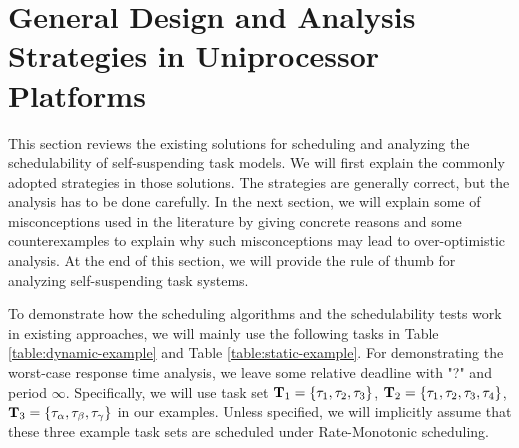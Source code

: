 \section{General Design and Analysis Strategies in Uniprocessor Platforms}
\label{sec:review}

This section reviews the existing solutions for scheduling and analyzing the schedulability of self-suspending task models. We will first explain the commonly adopted strategies in those solutions. The  strategies are generally correct, but the analysis has to be done carefully.  In the next section, we will explain some of misconceptions used in the literature by giving concrete reasons and some counterexamples to explain why such misconceptions may lead to over-optimistic analysis. At the end of this section, we will provide the rule of thumb for analyzing self-suspending task systems. 

To demonstrate how the scheduling algorithms and the schedulability tests work in existing approaches, we will mainly use the following tasks in Table \ref{table:dynamic-example} and Table \ref{table:static-example}. For demonstrating the worst-case response time analysis, we leave some relative deadline with "?" and period $\infty$. Specifically, we will use task set ${\bf T}_1 = \left\{{\tau_1, \tau_2, \tau_3}\right\}$, ${\bf T}_2 = \left\{{\tau_1, \tau_2, \tau_3, \tau_4}\right\}$, ${\bf T}_3 = \left\{{\tau_\alpha, \tau_\beta, \tau_\gamma}\right\}$ in our examples. Unless specified, we will implicitly assume that these three example task sets are scheduled under Rate-Monotonic scheduling. 

